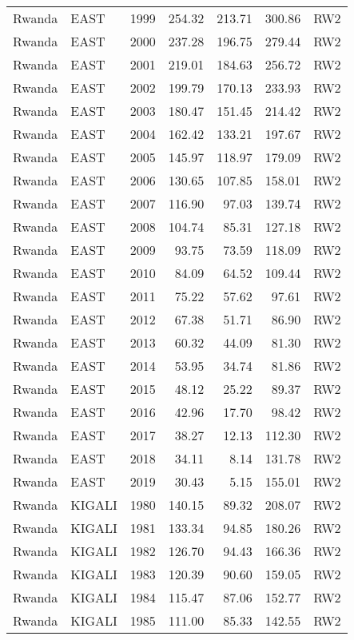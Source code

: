 \begin{longtable}{lllrrrl}
  Rwanda & EAST & 1999 & 254.32 & 213.71 & 300.86 & RW2 \\ 
  Rwanda & EAST & 2000 & 237.28 & 196.75 & 279.44 & RW2 \\ 
  Rwanda & EAST & 2001 & 219.01 & 184.63 & 256.72 & RW2 \\ 
  Rwanda & EAST & 2002 & 199.79 & 170.13 & 233.93 & RW2 \\ 
  Rwanda & EAST & 2003 & 180.47 & 151.45 & 214.42 & RW2 \\ 
  Rwanda & EAST & 2004 & 162.42 & 133.21 & 197.67 & RW2 \\ 
  Rwanda & EAST & 2005 & 145.97 & 118.97 & 179.09 & RW2 \\ 
  Rwanda & EAST & 2006 & 130.65 & 107.85 & 158.01 & RW2 \\ 
  Rwanda & EAST & 2007 & 116.90 & 97.03 & 139.74 & RW2 \\ 
  Rwanda & EAST & 2008 & 104.74 & 85.31 & 127.18 & RW2 \\ 
  Rwanda & EAST & 2009 & 93.75 & 73.59 & 118.09 & RW2 \\ 
  Rwanda & EAST & 2010 & 84.09 & 64.52 & 109.44 & RW2 \\ 
  Rwanda & EAST & 2011 & 75.22 & 57.62 & 97.61 & RW2 \\ 
  Rwanda & EAST & 2012 & 67.38 & 51.71 & 86.90 & RW2 \\ 
  Rwanda & EAST & 2013 & 60.32 & 44.09 & 81.30 & RW2 \\ 
  Rwanda & EAST & 2014 & 53.95 & 34.74 & 81.86 & RW2 \\ 
  Rwanda & EAST & 2015 & 48.12 & 25.22 & 89.37 & RW2 \\ 
  Rwanda & EAST & 2016 & 42.96 & 17.70 & 98.42 & RW2 \\ 
  Rwanda & EAST & 2017 & 38.27 & 12.13 & 112.30 & RW2 \\ 
  Rwanda & EAST & 2018 & 34.11 & 8.14 & 131.78 & RW2 \\ 
  Rwanda & EAST & 2019 & 30.43 & 5.15 & 155.01 & RW2 \\ 
  Rwanda & KIGALI & 1980 & 140.15 & 89.32 & 208.07 & RW2 \\ 
  Rwanda & KIGALI & 1981 & 133.34 & 94.85 & 180.26 & RW2 \\ 
  Rwanda & KIGALI & 1982 & 126.70 & 94.43 & 166.36 & RW2 \\ 
  Rwanda & KIGALI & 1983 & 120.39 & 90.60 & 159.05 & RW2 \\ 
  Rwanda & KIGALI & 1984 & 115.47 & 87.06 & 152.77 & RW2 \\ 
  Rwanda & KIGALI & 1985 & 111.00 & 85.33 & 142.55 & RW2 \\ 

\end{longtable}

